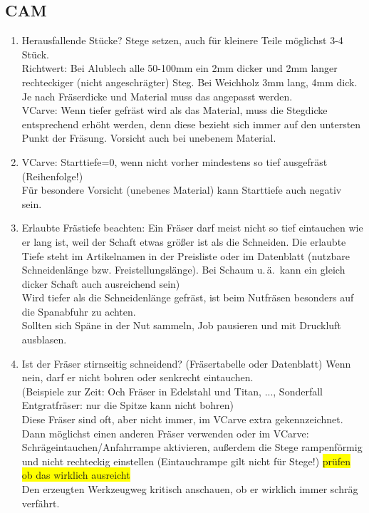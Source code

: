 \documentclass{\basedir/fablab-document}
\renewcommand{\todo}[1]{\colorbox{yellow}{{#1}}}
\begin{document}
\subsection{CAM}
\begin{enumerate}
 \item Herausfallende Stücke? Stege setzen, auch für kleinere Teile möglichst 3-4 Stück.\\Richtwert: Bei Alublech alle 50-100mm ein 2mm dicker und 2mm langer rechteckiger (nicht angeschrägter) Steg. Bei Weichholz 3mm lang, 4mm dick. Je nach Fräserdicke und Material muss das angepasst werden.\\
VCarve: Wenn tiefer gefräst wird als das Material, muss die Stegdicke entsprechend erhöht werden, denn diese bezieht sich immer auf den untersten Punkt der Fräsung. Vorsicht auch bei unebenem Material.
 \item VCarve: Starttiefe=0, wenn nicht vorher mindestens so tief ausgefräst (Reihenfolge!)\\
Für besondere Vorsicht (unebenes Material) kann Starttiefe auch negativ sein.
 \item Erlaubte Frästiefe beachten: Ein Fräser darf meist nicht so tief eintauchen wie er lang ist, weil der Schaft etwas größer ist als die Schneiden. Die erlaubte Tiefe steht im Artikelnamen in der Preisliste oder im Datenblatt (nutzbare Schneidenlänge bzw. Freistellungslänge).
Bei Schaum u.\,ä.\  kann ein gleich dicker Schaft auch ausreichend sein) \\
 Wird tiefer als die Schneidenlänge gefräst, ist beim Nutfräsen besonders auf die Spanabfuhr zu achten. \\
 Sollten sich Späne in der Nut sammeln, Job pausieren und mit Druckluft ausblasen.
 \item Ist der Fräser stirnseitig schneidend? (Fräsertabelle oder Datenblatt) Wenn nein, darf er nicht bohren oder senkrecht eintauchen.\\
(Beispiele zur Zeit: Och Fräser in Edelstahl und Titan, ..., Sonderfall Entgratfräser: nur die Spitze kann nicht bohren)\\
Diese Fräser sind oft, aber nicht immer, im VCarve extra gekennzeichnet.\\
Dann möglichst einen anderen Fräser verwenden oder im VCarve: Schrägeintauchen/Anfahrrampe aktivieren, außerdem die Stege rampenförmig und nicht rechteckig einstellen (Eintauchrampe gilt nicht für Stege!)  \todo{prüfen ob das wirklich ausreicht}\\
Den erzeugten Werkzeugweg kritisch anschauen, ob er wirklich immer schräg verfährt.

\end{enumerate}
\end{document}
